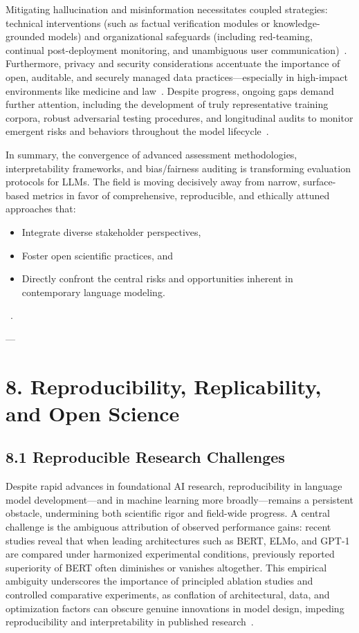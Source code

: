 \documentclass[11pt]{article}
\begin{document}
Mitigating hallucination and misinformation necessitates coupled strategies: technical interventions (such as factual verification modules or knowledge-grounded models) and organizational safeguards (including red-teaming, continual post-deployment monitoring, and unambiguous user communication)~\cite{3,10,21,42,43,65}. Furthermore, privacy and security considerations accentuate the importance of open, auditable, and securely managed data practices—especially in high-impact environments like medicine and law~\cite{14,36,42,46,53,65}. Despite progress, ongoing gaps demand further attention, including the development of truly representative training corpora, robust adversarial testing procedures, and longitudinal audits to monitor emergent risks and behaviors throughout the model lifecycle~\cite{21,23,42,65,73}.

In summary, the convergence of advanced assessment methodologies, interpretability frameworks, and bias/fairness auditing is transforming evaluation protocols for LLMs. The field is moving decisively away from narrow, surface-based metrics in favor of comprehensive, reproducible, and ethically attuned approaches that:
\begin{itemize}
    \item Integrate diverse stakeholder perspectives,
    \item Foster open scientific practices, and
    \item Directly confront the central risks and opportunities inherent in contemporary language modeling.
\end{itemize}
~\cite{1,3,10,14,19,35,36,43,45,46,49,52,65,73,76,81,83,84,85,91,94,95,101,104,106,108}.

---

\section{8. Reproducibility, Replicability, and Open Science}

\subsection{8.1 Reproducible Research Challenges}

Despite rapid advances in foundational AI research, reproducibility in language model development—and in machine learning more broadly—remains a persistent obstacle, undermining both scientific rigor and field-wide progress. A central challenge is the ambiguous attribution of observed performance gains: recent studies reveal that when leading architectures such as BERT, ELMo, and GPT-1 are compared under harmonized experimental conditions, previously reported superiority of BERT often diminishes or vanishes altogether. This empirical ambiguity underscores the importance of principled ablation studies and controlled comparative experiments, as conflation of architectural, data, and optimization factors can obscure genuine innovations in model design, impeding reproducibility and interpretability in published research~\cite{ref107}.
\end{document}

